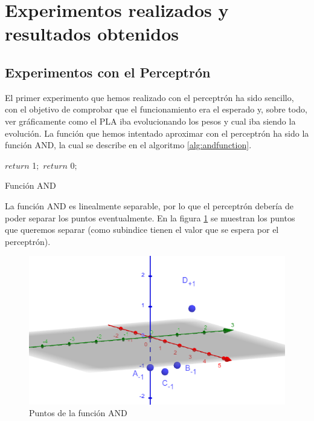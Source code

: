 \section{Experimentos realizados y resultados obtenidos}
\subsection{Experimentos con el Perceptrón}
\label{subsec:perceptronexperiment}

El primer experimento que hemos realizado con el perceptrón ha sido sencillo, con el objetivo de comprobar que el funcionamiento era el esperado y, sobre todo, ver gráficamente como el PLA iba evolucionando los pesos y cual iba siendo la evolución. La función que hemos intentado aproximar con el perceptrón ha sido la función AND, la cual se describe en el algoritmo \ref{alg:andfunction}.

\begin{algorithm}
    
    {
        $return$ 1$;$
    }
    {
        $return$ 0$;$
    }

	\caption{Función AND}
	\label{alg:andfunction}
\end{algorithm}

La función AND es linealmente separable, por lo que el perceptrón debería de poder separar los puntos eventualmente. En la figura \ref{fig:andFunctionTargets} se muestran los puntos que queremos separar (como subindice tienen el valor que se espera por el perceptrón).

\begin{figure}[h]
	\centering
	\includegraphics[width=1\textwidth]{Figures/PerceptronTargets}
	\caption{Puntos de la función AND}
	\label{fig:andFunctionTargets}
\end{figure}


